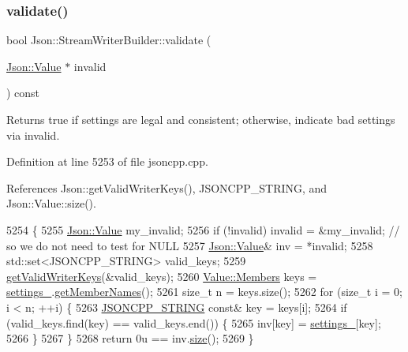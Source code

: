 \subsubsection{\texorpdfstring{validate()}{validate()}}
{\footnotesize\ttfamily bool Json\+::\+Stream\+Writer\+Builder\+::validate (\begin{DoxyParamCaption}\item[{\hyperlink{class_json_1_1_value}{Json\+::\+Value} $\ast$}]{invalid }\end{DoxyParamCaption}) const}

\begin{DoxyReturn}{Returns}
true if \textquotesingle{}settings\textquotesingle{} are legal and consistent; otherwise, indicate bad settings via \textquotesingle{}invalid\textquotesingle{}. 
\end{DoxyReturn}


Definition at line 5253 of file jsoncpp.\+cpp.



References Json\+::get\+Valid\+Writer\+Keys(), J\+S\+O\+N\+C\+P\+P\+\_\+\+S\+T\+R\+I\+NG, and Json\+::\+Value\+::size().


\begin{DoxyCode}
5254 \{
5255   \hyperlink{class_json_1_1_value}{Json::Value} my\_invalid;
5256   \textcolor{keywordflow}{if} (!invalid) invalid = &my\_invalid;  \textcolor{comment}{// so we do not need to test for NULL}
5257   \hyperlink{class_json_1_1_value}{Json::Value}& inv = *invalid;
5258   std::set<JSONCPP\_STRING> valid\_keys;
5259   \hyperlink{namespace_json_a77ffcc6bb405332d84c260d304d4384e}{getValidWriterKeys}(&valid\_keys);
5260   \hyperlink{class_json_1_1_value_a9ae9069983fc38f1928d76f9c79ac64d}{Value::Members} keys = \hyperlink{class_json_1_1_stream_writer_builder_a79bdf2e639a52f4e758c0b95bd1d3423}{settings\_}.\hyperlink{class_json_1_1_value_a79d7725dce6260317333e69022367ac9}{getMemberNames}();
5261   \textcolor{keywordtype}{size\_t} n = keys.size();
5262   \textcolor{keywordflow}{for} (\textcolor{keywordtype}{size\_t} i = 0; i < n; ++i) \{
5263     \hyperlink{json_8h_a1e723f95759de062585bc4a8fd3fa4be}{JSONCPP\_STRING} \textcolor{keyword}{const}& key = keys[i];
5264     \textcolor{keywordflow}{if} (valid\_keys.find(key) == valid\_keys.end()) \{
5265       inv[key] = \hyperlink{class_json_1_1_stream_writer_builder_a79bdf2e639a52f4e758c0b95bd1d3423}{settings\_}[key];
5266     \}
5267   \}
5268   \textcolor{keywordflow}{return} 0u == inv.\hyperlink{class_json_1_1_value_a0ec2808e1d7efa4e9fad938d6667be44}{size}();
5269 \}
\end{DoxyCode}


